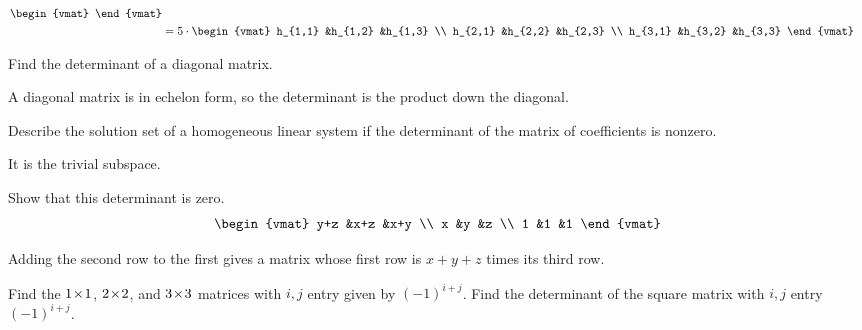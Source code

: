 \begin{exercises}
\begin{answer}
\begin{exparts}
\begin{align*}
\begin{vmat}
          \end{vmat}                                     \\
          &=5\cdot
          \begin{vmat}
            h_{1,1}          &h_{1,2}         &h_{1,3} \\
            h_{2,1}          &h_{2,2}         &h_{2,3} \\
            h_{3,1}          &h_{3,2}         &h_{3,3}
          \end{vmat}
          \end{align*}
      \end{exparts}  
     \end{answer}
  \recommended \item 
    Find the determinant of a diagonal matrix.
    \begin{answer}
       A diagonal matrix is in echelon form, so
       the determinant is the product down the diagonal.
    \end{answer}
  \item 
    Describe the solution set of a homogeneous linear system if the
    determinant of the matrix of coefficients is nonzero.
    \begin{answer}
      It is the trivial subspace.  
    \end{answer}
  \recommended \item 
    Show that this determinant is zero.
    \begin{equation*}
      \begin{vmat}
        y+z  &x+z  &x+y  \\
        x    &y    &z    \\
        1    &1    &1
      \end{vmat}
    \end{equation*}
    \begin{answer} 
      Adding the second row to the first gives a matrix whose first row
      is $x+y+z$ times its third row.  
    \end{answer}
  \item 
    \begin{exparts}
      \partsitem Find the $1 \! \times \! 1$, $2 \! \times \! 2$, and $3 \! \times \! 3$ matrices
        with $i,j$ entry given by $(-1)^{i+j}$.  
      \partsitem Find the determinant of the square matrix with \( i,j \)
        entry \( (-1)^{i+j} \).
    \end{exparts}
    \begin{answer}
      \begin{exparts}

\end{exparts}
\end{answer}
\end{exercises}
